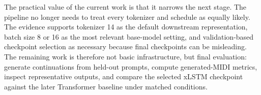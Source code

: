 The practical value of the current work is that it narrows the next stage. The
pipeline no longer needs to treat every tokenizer and schedule as equally likely.
The evidence supports tokenizer 14 as the default downstream representation,
batch size 8 or 16 as the most relevant base-model setting, and validation-based
checkpoint selection as necessary because final checkpoints can be misleading.
The remaining work is therefore not basic infrastructure, but final evaluation:
generate continuations from held-out prompts, compute generated-MIDI metrics,
inspect representative outputs, and compare the selected xLSTM checkpoint against
the later Transformer baseline under matched conditions.
